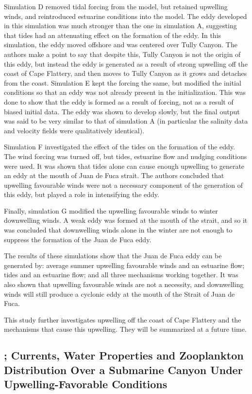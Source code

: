 \documentclass[12pt]{extreport}
\begin{document}
Simulation D removed tidal forcing from the model, but retained upwelling winds, and reintroduced estuarine conditions into the model. The eddy developed in this simulation was much stronger than the one in simulation A, suggesting that tides had an attenuating effect on the formation of the eddy. In this simulation, the eddy moved offshore and was centered over Tully Canyon. The authors make a point to say that despite this, Tully Canyon is not the origin of this eddy, but instead the eddy is generated as a result of strong upwelling off the coast of Cape Flattery, and then moves to Tully Canyon as it grows and detaches from the coast.
Simulation E kept the forcing the same, but modified the initial conditions so that an eddy was not already present in the initialization. This was done to show that the eddy is formed as a result of forcing, not as a result of biased initial data. The eddy was shown to develop slowly, but the final output was said to be very similar to that of simulation A (in particular the salinity data and velocity fields were qualitatively identical).

Simulation F investigated the effect of the tides on the formation of the eddy. The wind forcing was turned off, but tides, estuarine flow and nudging conditions were used. It was shown that tides alone can cause enough upwelling to generate an eddy at the mouth of Juan de Fuca strait. The authors concluded that upwelling favourable winds were not a necessary component of the generation of this eddy, but played a role in intensifying the eddy.

Finally, simulation G modified the upwelling favourable winds to winter downwelling winds. A weak eddy was formed at the mouth of the strait, and so it was concluded that downwelling winds alone in the winter are not enough to suppress the formation of the Juan de Fuca eddy. 

The results of these simulations show that the Juan de Fuca eddy can be generated by: average summer upwelling favourable winds and an estuarine flow; tides and an estuarine flow; and all three mechanisms working together. It was also shown that upwelling favourable winds are not a necessity, and downwelling winds will still produce a cyclonic eddy at the mouth of the Strait of Juan de Fuca.

This study further investigates upwelling off the coast of Cape Flattery and the mechanisms that cause this upwelling. They will be summarized at a future time.

\subsection{\cite{vindeirinho1998water}; Currents, Water Properties and Zooplankton Distribution Over a Submarine Canyon Under Upwelling-Favorable Conditions}
\end{document}
